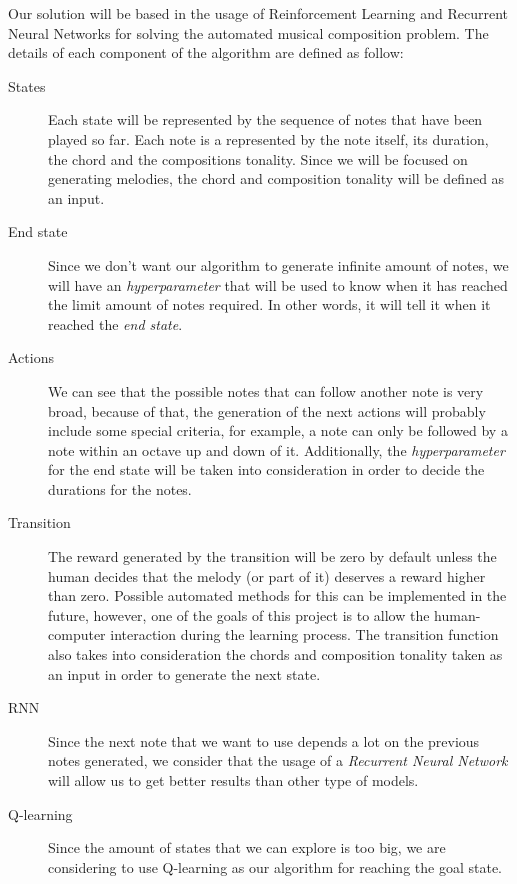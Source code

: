 Our solution will be based in the usage of Reinforcement Learning and Recurrent Neural Networks for solving the automated musical composition problem. The details of each component of the algorithm are defined as follow:

\begin{description}
  \item [States] Each state will be represented by the sequence of notes that have been played so far. Each note is a represented by the note itself, its duration, the chord and the compositions tonality. Since we will be focused on generating melodies, the chord and composition tonality will be defined as an input.
  \item [End state] Since we don't want our algorithm to generate infinite amount of notes, we will have an \emph{hyperparameter} that will be used to know when it has reached the limit amount of notes required. In other words, it will tell it when it reached the \emph{end state}.
  \item [Actions] We can see that the possible notes that can follow another note is very broad, because of that, the generation of the next actions will probably include some special criteria, for example, a note can only be followed by a note within an octave up and down of it. Additionally, the \emph{hyperparameter} for the end state will be taken into consideration in order to decide the durations for the notes.
  \item [Transition] The reward generated by the transition will be zero by default unless the human decides that the melody (or part of it) deserves a reward higher than zero. Possible automated methods for this can be implemented in the future, however, one of the goals of this project is to allow the human-computer interaction during the learning process. The transition function also takes into consideration the chords and composition tonality taken as an input in order to generate the next state.
  \item [RNN] Since the next note that we want to use depends a lot on the previous notes generated, we consider that the usage of a \emph{Recurrent Neural Network} will allow us to get better results than other type of models.
  \item [Q-learning] Since the amount of states that we can explore is too big, we are considering to use Q-learning as our algorithm for reaching the goal state.
\end{description}

